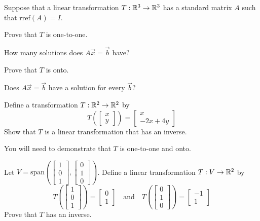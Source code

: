 \documentclass{ximera}
\begin{document}
 \begin{problem}
 Suppose that a linear transformation $T:\mathbb{R}^3\rightarrow \mathbb{R}^3$ has a standard matrix $A$ such that $\text{rref}(A)=I$.
 
 Prove that $T$ is one-to-one.
 \begin{hint}
 How many solutions does $A\vec{x}=\vec{b}$ have?
 \end{hint}
 Prove that $T$ is onto.
 \begin{hint}
 Does $A\vec{x}=\vec{b}$ have a solution for every $\vec{b}$?
 \end{hint}
 \end{problem}
 
 \begin{problem}
 Define a transformation $T:\mathbb{R}^2\rightarrow \mathbb{R}^2$ by 
 $$T\left(\begin{bmatrix}x\\y\end{bmatrix}\right)=\begin{bmatrix}x\\-2x+4y\end{bmatrix}$$
 Show that $T$ is a linear transformation that has an inverse.
 \begin{hint}
You will need to demonstrate that $T$ is one-to-one and onto.
 \end{hint}
 \end{problem}
 
 \begin{problem}
 Let $V=\text{span}\left(\begin{bmatrix}1\\0\\1\end{bmatrix}, \begin{bmatrix}0\\1\\0\end{bmatrix}\right)$.  Define a linear transformation $T:V\rightarrow \mathbb{R}^2$ by
 $$T\left(\begin{bmatrix}1\\0\\1\end{bmatrix}\right)=\begin{bmatrix}0\\1\end{bmatrix}\quad \text{and}\quad T\left(\begin{bmatrix}0\\1\\0\end{bmatrix}\right)=\begin{bmatrix}-1\\1\end{bmatrix}$$
 Prove that $T$ has an inverse.
 \end{problem}
\end{document}
